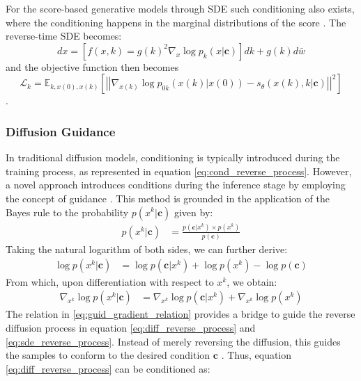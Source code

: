 For the score-based generative models through SDE such conditioning also exists, where the conditioning happens in the marginal distributions of the score \cite{yan_scoregrad_2021}. The reverse-time SDE becomes: 
\begin{equation} \label{eq:cond_sde_reverse_time}
    dx = \left[ f(x, k) = g(k)^2 \nabla_{x} \log{p_k(x|\mathbf{c})} \right] dk + g(k)d\bar{w}
\end{equation}
and the objective function then becomes
\begin{equation} \label{eq:cond_sde_train_obj}
    \mathcal{L}_k = \mathbb{E}_{k, x(0), x(k)} \left[\left|\left| \nabla_{x(k)} \log{p_{0k}(x(k) | x(0))} - s_\theta(x(k),  k | \mathbf{c})\right|\right|^2 \right]    
\end{equation}.

\subsubsection{Diffusion Guidance} \label{sec:conditional_diff_guidance}
In traditional diffusion models, conditioning is typically introduced during the training process, as represented in equation \eqref{eq:cond_reverse_process}. However, a novel approach introduces conditions during the inference stage by employing the concept of guidance \cite{sohl-dickstein_deep_2015, song_score-based_2021}. This method is grounded in the application of the Bayes rule to the probability $p(x^k|\mathbf{c})$ given by:
\begin{align}
    p(x^k|\mathbf{c}) &= \frac{p(\mathbf{c}|x^k) \times p(x^k)}{p(\mathbf{c})} 
\end{align}
Taking the natural logarithm of both sides, we can further derive:
\begin{align} 
    \log{p(x^k|\mathbf{c})} &= \log{p(\mathbf{c}|x^k)} + \log{p(x^k)} - \log{p(\mathbf{c})} 
\end{align}
From which, upon differentiation with respect to $x^k$, we obtain:
\begin{align} \label{eq:guid_gradient_relation}
    \nabla_{x^k} \log p(x^k|\mathbf{c}) &= \nabla_{x^k} \log p(\mathbf{c}|x^k) + \nabla_{x^k} \log p(x^k) 
\end{align}
The relation in \eqref{eq:guid_gradient_relation} provides a bridge to guide the reverse diffusion process in equation \eqref{eq:diff_reverse_process} and \eqref{eq:sde_reverse_process}. Instead of merely reversing the diffusion, this guides the samples to conform to the desired condition $\mathbf{c}$ \cite{sohl-dickstein_deep_2015, song_score-based_2021}. Thus, equation \eqref{eq:diff_reverse_process} can be conditioned as:
